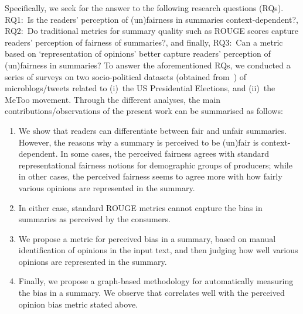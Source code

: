Specifically, we seek for the answer to the following research questions (RQs). 
RQ1:~Is the readers' perception of (un)fairness in summaries context-dependent?, 
RQ2:~Do traditional metrics for summary quality such as ROUGE scores capture readers' perception of fairness of summaries?, and finally, 
RQ3:~Can a metric based on `representation of opinions’ better capture readers’ perception of (un)fairness in summaries? 
To answer the aforementioned RQs, we conducted a series of surveys on two socio-political datasets (obtained from~\cite{dash2019summarizing}) of microblogs/tweets related to (i)~the US Presidential Elections, and (ii)~the MeToo movement. 
Through the different analyses, the main contributions/observations of the present work can be summarised as follows:
\begin{enumerate}
	\item We show that readers can differentiate between fair and unfair summaries. However, the reasons why a summary is perceived to be (un)fair is context-dependent. In some cases, the perceived fairness agrees with standard representational fairness notions for demographic groups of producers; while in other cases, the perceived fairness seems to agree more with how fairly various opinions are represented in the summary.
	\item In either case, standard ROUGE metrics cannot capture the bias in summaries as perceived by the consumers.
	\item We propose a metric for perceived bias in a summary, based on manual identification of opinions in the input text, and then judging how well various opinions are represented in the summary.
	\item Finally, we propose a graph-based methodology for automatically measuring the bias in a summary. We observe that correlates well with the perceived opinion bias metric stated above.
\end{enumerate}

